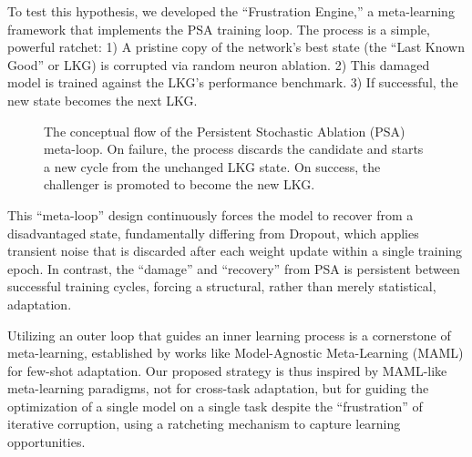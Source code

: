 \documentclass[conference]{IEEEtran}
\begin{document}
To test this hypothesis, we developed the ``Frustration Engine,'' a meta-learning framework that implements the PSA training loop. The process is a simple, powerful ratchet: 1) A pristine copy of the network's best state (the ``Last Known Good'' or LKG) is corrupted via random neuron ablation. 2) This damaged model is trained against the LKG's performance benchmark. 3) If successful, the new state becomes the next LKG.

\begin{figure}[h!]
\centering
{}
\caption{The conceptual flow of the Persistent Stochastic Ablation (PSA) meta-loop. On failure, the process discards the candidate and starts a new cycle from the unchanged LKG state. On success, the challenger is promoted to become the new LKG.}
\label{fig:psa-flow-vertical}
\end{figure}

This ``meta-loop'' design continuously forces the model to recover from a disadvantaged state, fundamentally differing from Dropout, which applies transient noise that is discarded after each weight update within a single training epoch. In contrast, the ``damage'' and ``recovery'' from PSA is persistent between successful training cycles, forcing a structural, rather than merely statistical, adaptation.

Utilizing an outer loop that guides an inner learning process is a cornerstone of meta-learning, established by works like Model-Agnostic Meta-Learning (MAML) \cite{b6} for few-shot adaptation. Our proposed strategy is thus inspired by MAML-like meta-learning paradigms, not for cross-task adaptation, but for guiding the optimization of a single model on a single task despite the ``frustration'' of iterative corruption, using a ratcheting mechanism to capture learning opportunities.
\end{document}
